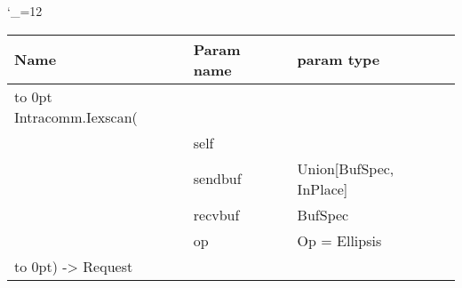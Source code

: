 \begingroup \catcode`\_=12 \tt
\begin{tabular}{lll}
\toprule
\textrm{Name}&\textrm{Param name}&\textrm{param type}\\
\midrule
\hbox to 0pt {Intracomm.Iexscan(\hss}\\
& self\\
& sendbuf & Union[BufSpec, InPlace]\\
& recvbuf & BufSpec\\
& op & Op = Ellipsis\\
\hbox to 0pt{) -> Request\hss}\\
\bottomrule
\end{tabular}
\endgroup

